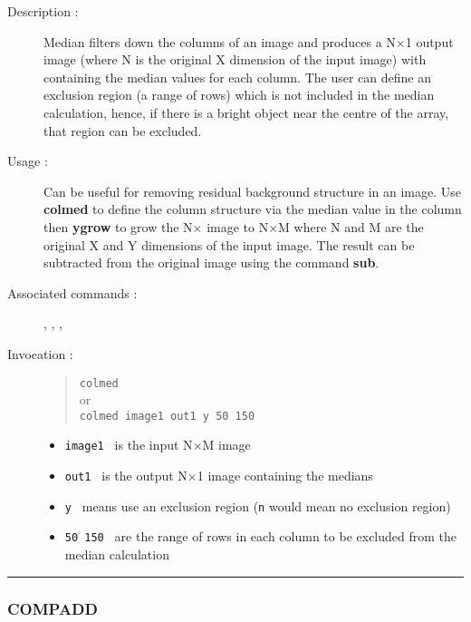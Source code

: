 \begin{description}

\item[Description :] Median filters down the columns of an image
and produces a N$\times$1 output image (where N is the original X
dimension of the input image) with containing the median values for
each column.  The user can define an exclusion region (a range of rows)
which is not included in the median calculation, hence, if there is a
bright object near the centre of the array, that region can be
excluded.

\item[Usage :] Can be useful for removing residual background structure in an
image.  Use {\bf colmed} to define the column structure via the median value
in the column then {\bf ygrow} to grow the N$\times$ image to N$\times$M
where N and M are the original X and Y dimensions of the input image.
The result can be subtracted from the original image using the command
{\bf sub}.

\item[Associated commands :] {\tt {}},
{\tt {}}, {\tt {}},
{\tt {}}

\item[Invocation :]

\begin{quote}{\tt  colmed} \\
or \\
{\tt colmed image1 out1 y 50 150 }
\end{quote}

\begin{itemize}

\item {\tt image1 } is the input N$\times$M image
\item {\tt out1 } is the output N$\times$1 image containing the medians
\item {\tt y } means use an exclusion region ({\tt n} would mean no exclusion
 region)
\item {\tt 50 150 } are the range of rows in each column to be excluded
 from the median calculation
\end{itemize}

\end{description}

\hrule
\subsubsection*{\label{COMPADD}COMPADD}


